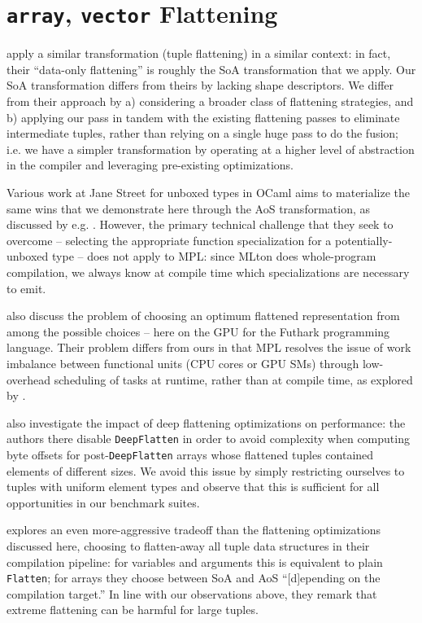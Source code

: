 \section{\texttt{array}, \texttt{vector} Flattening}

\citet{dataonly-paper} apply a similar transformation (tuple flattening) in a
similar context: in fact, their ``data-only flattening'' is roughly the SoA
transformation that we apply. Our SoA transformation differs from theirs by
lacking shape descriptors. We differ from their approach by a) considering a
broader class of flattening strategies, and b) applying our pass in tandem with
the existing flattening passes to eliminate intermediate tuples, rather than
relying on a single huge pass to do the fusion; i.e. we have a simpler
transformation by operating at a higher level of abstraction in the compiler and
leveraging pre-existing optimizations.

Various work at Jane Street for unboxed types in OCaml aims to materialize the
same wins that we demonstrate here through the AoS transformation, as discussed
by e.g. \citet{layout-poly-paper}. However, the primary technical challenge that
they seek to overcome -- selecting the appropriate function specialization for a
potentially-unboxed type -- does not apply to MPL: since MLton does whole-program
compilation, we always know at compile time which specializations are necessary
to emit.

\citet{futhark-flatten} also discuss the problem of choosing an optimum
flattened representation from among the possible choices -- here on the GPU for
the Futhark programming language. Their problem differs from ours in that MPL
resolves the issue of work imbalance between functional units (CPU cores or GPU
SMs) through low-overhead scheduling of tasks at runtime, rather than at compile
time, as explored by \citet{mpl-sched-paper}.

\citet{realtime-sml-paper} also investigate the impact of deep flattening
optimizations on performance: the authors there disable \texttt{DeepFlatten} in
order to avoid complexity when computing byte offsets for
post-\texttt{DeepFlatten} arrays whose flattened tuples contained elements of
different sizes. We avoid this issue by simply restricting ourselves to tuples
with uniform element types and observe that this is sufficient for all
opportunities in our benchmark suites.

\citet{virgil-paper} explores an even more-aggressive tradeoff than the
flattening optimizations discussed here, choosing to flatten-away all tuple data
structures in their compilation pipeline: for variables and arguments this is
equivalent to plain \texttt{Flatten}; for arrays they choose between SoA and AoS
``[d]epending on the compilation target.'' In line with our observations above,
they remark that extreme flattening can be harmful for large tuples.

